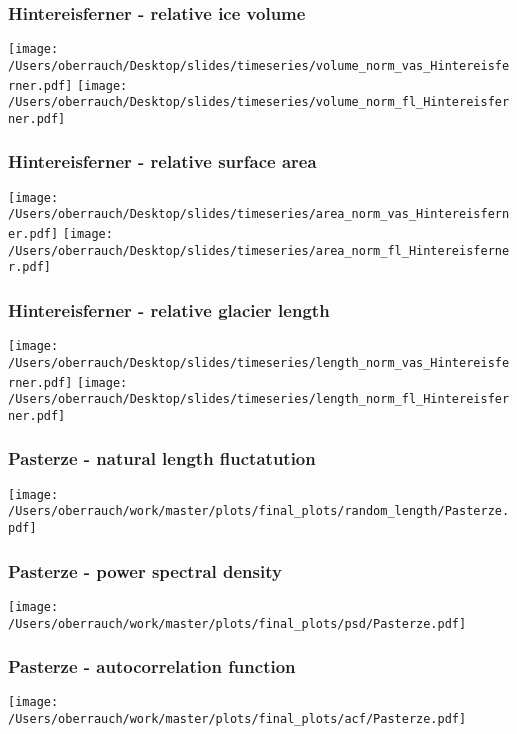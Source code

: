 \documentclass[12pt, aspectratio=169, abstract=off, oneside]{beamer}
\begin{document}
    \begin{frame}[t]\frametitle{Hintereisferner - relative ice volume}
        \centering
        \vfill
        \texttt{[image: /Users/oberrauch/Desktop/slides/timeseries/volume\_norm\_vas\_Hintereisferner.pdf]}
        \texttt{[image: /Users/oberrauch/Desktop/slides/timeseries/volume\_norm\_fl\_Hintereisferner.pdf]}
    \end{frame}
        
    \begin{frame}[t]\frametitle{Hintereisferner - relative surface area}
        \centering
        \vfill
        \texttt{[image: /Users/oberrauch/Desktop/slides/timeseries/area\_norm\_vas\_Hintereisferner.pdf]}
        \texttt{[image: /Users/oberrauch/Desktop/slides/timeseries/area\_norm\_fl\_Hintereisferner.pdf]}
    \end{frame}
        
    \begin{frame}[t]\frametitle{Hintereisferner - relative glacier length}
        \centering
        \vfill
        \texttt{[image: /Users/oberrauch/Desktop/slides/timeseries/length\_norm\_vas\_Hintereisferner.pdf]}
        \texttt{[image: /Users/oberrauch/Desktop/slides/timeseries/length\_norm\_fl\_Hintereisferner.pdf]}
    
    \end{frame}

    \begin{frame}[t]\frametitle{Pasterze - natural length fluctatution}
        \centering
        \vfill
        \texttt{[image: /Users/oberrauch/work/master/plots/final\_plots/random\_length/Pasterze.pdf]}
    
    \end{frame}
    
    \begin{frame}[t]\frametitle{Pasterze - power spectral density}
        \centering
        \vfill
        \texttt{[image: /Users/oberrauch/work/master/plots/final\_plots/psd/Pasterze.pdf]}
    
    \end{frame}

    \begin{frame}[t]\frametitle{Pasterze - autocorrelation function}
        \centering
        \vfill
        \texttt{[image: /Users/oberrauch/work/master/plots/final\_plots/acf/Pasterze.pdf]}
    
    \end{frame}
\end{document}
